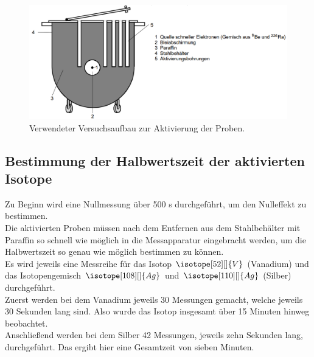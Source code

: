 \begin{figure}
    \centering
    \includegraphics[width=15cm]{Bilder/Aktivierung.png}
    \caption{Verwendeter Versuchsaufbau zur Aktivierung der Proben.\cite{sample}}
    \label{Abb:Aktivierung}
\end{figure}

\subsection{Bestimmung der Halbwertszeit der aktivierten Isotope}

Zu Beginn wird eine Nullmessung über 500 s durchgeführt, um den Nulleffekt zu bestimmen.\\
Die aktivierten Proben müssen nach dem Entfernen aus dem Stahlbehälter mit Paraffin so schnell wie möglich in die Messapparatur
eingebracht werden, um die Halbwertszeit so genau wie möglich bestimmen zu können.\\
Es wird jeweils eine Messreihe für das Isotop $\isotope[52][]{V}$ (Vanadium) und das Isotopengemisch $\isotope[108][]{Ag}$ und 
$\isotope[110][]{Ag}$ (Silber) durchgeführt.\\
Zuerst werden bei dem Vanadium jeweils 30 Messungen gemacht, welche jeweils 30 Sekunden lang sind. Also wurde das Isotop
insgesamt über 15 Minuten hinweg beobachtet.\\
Anschließend werden bei dem Silber 42 Messungen, jeweils zehn Sekunden lang, durchgeführt. Das ergibt hier eine Gesamtzeit von sieben Minuten.\\